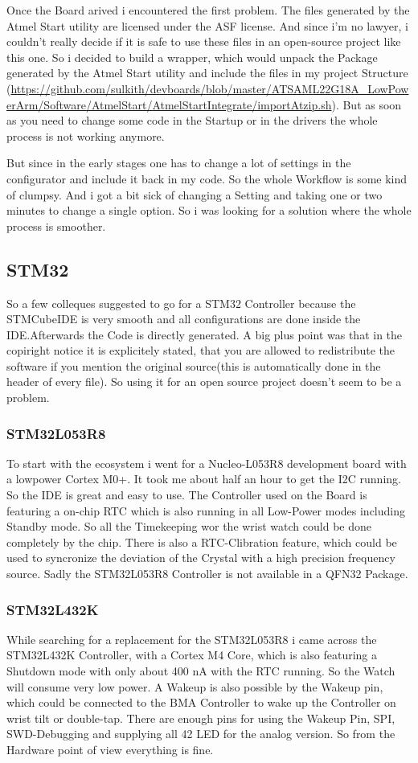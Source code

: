 Once the Board arived i encountered the first problem. The files generated by the Atmel Start utility are licensed under the ASF license. And since i'm no lawyer, i couldn't really decide if it is safe to use these files in an open-source project like this one. So i decided to build a wrapper, which would unpack the Package generated by the Atmel Start utility and include the files in my project Structure (\url{https://github.com/sulkith/devboards/blob/master/ATSAML22G18A_LowPowerArm/Software/AtmelStart/AtmelStartIntegrate/importAtzip.sh}). But as soon as you need to change some code in the Startup or in the drivers the whole process is not working anymore.

But since in the early stages one has to change a lot of settings in the configurator and include it back in my code. So the whole Workflow is some kind of clumpsy. And i got a bit sick of changing a Setting and taking one or two minutes to change a single option. So i was looking for a solution where the whole process is smoother.

\subsection{STM32}
So a few colleques suggested to go for a STM32 Controller because the STMCubeIDE is very smooth and all configurations are done inside the IDE.Afterwards the Code is directly generated. A big plus point was that in the copiright notice it is explicitely stated, that you are allowed to redistribute the software if you mention the original source(this is automatically done in the header of every file). So using it for an open source project doesn't seem to be a problem.

\subsubsection{STM32L053R8}
To start with the ecosystem i went for a Nucleo-L053R8 development board with a lowpower Cortex M0+. It took me about half an hour to get the I2C running. So the IDE is great and easy to use. The Controller used on the Board is featuring a on-chip RTC which is also running in all Low-Power modes including Standby mode. So all the Timekeeping wor the wrist watch could be done completely by the chip. There is also a RTC-Clibration feature, which could be used to syncronize the deviation of the Crystal with a high precision frequency source. 
Sadly the STM32L053R8 Controller is not available in a QFN32 Package.
\subsubsection{STM32L432K} 
While searching for a replacement for the STM32L053R8 i came across the STM32L432K Controller, with a Cortex M4 Core, which is also featuring a Shutdown mode with only about 400 nA with the RTC running. So the Watch will consume very low power. A Wakeup is also possible by the Wakeup pin, which could be connected to the BMA Controller to wake up the Controller on wrist tilt or double-tap. There are enough pins for using the Wakeup Pin, SPI, SWD-Debugging and supplying all 42 LED for the analog version.
So from the Hardware point of view everything is fine.

